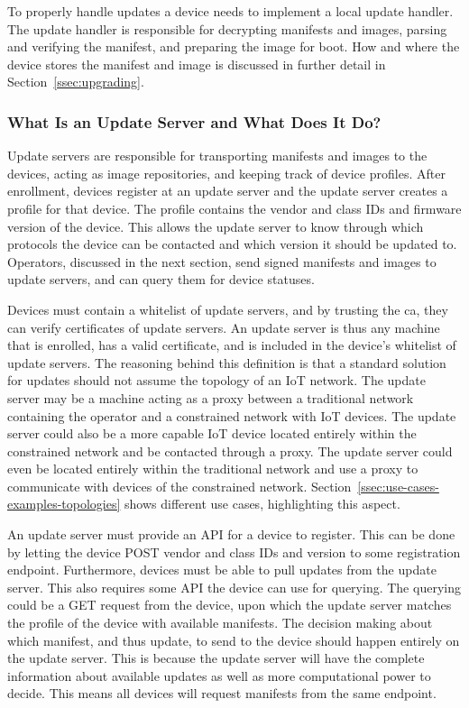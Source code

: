 \documentclass[0-thesis.tex]{subfiles}
\begin{document}
To properly handle updates a device needs to implement a local update handler. The update
handler is responsible for decrypting manifests and images, parsing and verifying the
manifest, and preparing the image for boot. How and where the device stores the manifest
and image is discussed in further detail in Section~\ref{ssec:upgrading}.

\subsubsection{What Is an Update Server and What Does It Do?}
\label{sssec:what-is-an-update-server}
Update servers are responsible for transporting manifests and images to the devices,
acting as image repositories, and keeping track of device profiles. After enrollment,
devices register at an update server and the update server creates a profile for that
device. The profile contains the vendor and class IDs and firmware version of the device.
This allows the update server to know through which protocols the device can be contacted
and which version it should be updated to. Operators, discussed in the next section, send
signed manifests and images to update servers, and can query them for device statuses.

Devices must contain a whitelist of update servers, and by trusting the \gls{ca}, they can
verify certificates of update servers. An update server is thus any machine that is
enrolled, has a valid certificate, and is included in the device's whitelist of update
servers. The reasoning behind this definition is that a standard solution for updates
should not assume the topology of an IoT network. The update server may be a machine
acting as a proxy between a traditional network containing the operator and a constrained
network with IoT devices. The update server could also be a more capable IoT device
located entirely within the constrained network and be contacted through a proxy. The
update server could even be located entirely within the traditional network and use a
proxy to communicate with devices of the constrained network.
Section~\ref{ssec:use-cases-examples-topologies} shows different use cases, highlighting
this aspect.

An update server must provide an API for a device to register. This can be done by letting
the device POST vendor and class IDs and version to some registration endpoint.
Furthermore, devices must be able to pull updates from the update server. This also
requires some API the device can use for querying. The querying could be a GET request
from the device, upon which the update server matches the profile of the device with
available manifests. The decision making about which manifest, and thus update, to send to
the device should happen entirely on the update server. This is because the update server
will have the complete information about available updates as well as more computational
power to decide. This means all devices will request manifests from the same endpoint.
\end{document}
